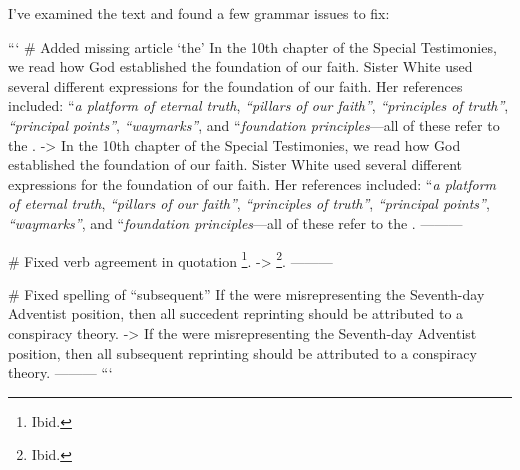 I've examined the text and found a few grammar issues to fix:

```
# Added missing article ‘the’
In the 10th chapter of the Special Testimonies, we read how God established the foundation of our faith. Sister White used several different expressions for the foundation of our faith. Her references included: “\textit{a platform of eternal truth}, \textit{“pillars of our faith”}, \textit{“principles of truth”}, \textit{“principal points”}, \textit{“waymarks”}, and “\textit{foundation principles}—all of these refer to the .
->
In the 10th chapter of the Special Testimonies, we read how God established the foundation of our faith. Sister White used several different expressions for the foundation of our faith. Her references included: “\textit{a platform of eternal truth}, \textit{“pillars of our faith”}, \textit{“principles of truth”}, \textit{“principal points”}, \textit{“waymarks”}, and “\textit{foundation principles}—all of these refer to the .
---------

# Fixed verb agreement in quotation
\footnote{Ibid.}.
->
\footnote{Ibid.}.
---------

# Fixed spelling of “subsequent”
If the  were misrepresenting the Seventh-day Adventist position, then all succedent reprinting should be attributed to a conspiracy theory.
->
If the  were misrepresenting the Seventh-day Adventist position, then all subsequent reprinting should be attributed to a conspiracy theory.
---------
```